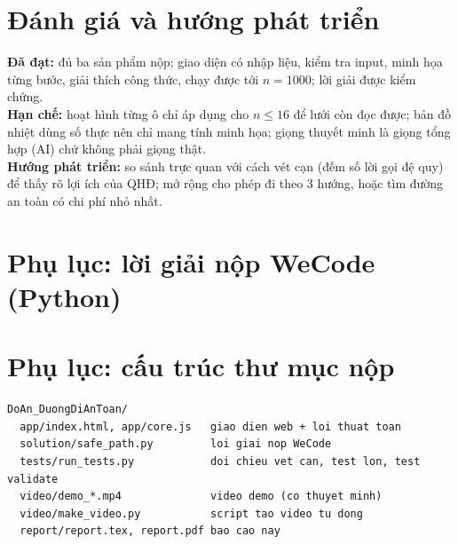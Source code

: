 \documentclass[12pt,a4paper]{article}
\begin{document}
\section{Đánh giá và hướng phát triển}
\textbf{Đã đạt:} đủ ba sản phẩm nộp; giao diện có nhập liệu, kiểm tra input, minh họa từng bước, giải thích công thức, chạy được tới $n=1000$; lời giải được kiểm chứng.\\
\textbf{Hạn chế:} hoạt hình từng ô chỉ áp dụng cho $n\le16$ để lưới còn đọc được; bản đồ nhiệt dùng số thực nên chỉ mang tính minh họa; giọng thuyết minh là giọng tổng hợp (AI) chứ không phải giọng thật.\\
\textbf{Hướng phát triển:} so sánh trực quan với cách vét cạn (đếm số lời gọi đệ quy) để thấy rõ lợi ích của QHĐ; mở rộng cho phép đi theo 3 hướng, hoặc tìm đường an toàn có chi phí nhỏ nhất.

\appendix
\section{Phụ lục: lời giải nộp WeCode (Python)}


\section{Phụ lục: cấu trúc thư mục nộp}
\begin{lstlisting}[numbers=none]
DoAn_DuongDiAnToan/
  app/index.html, app/core.js   giao dien web + loi thuat toan
  solution/safe_path.py         loi giai nop WeCode
  tests/run_tests.py            doi chieu vet can, test lon, test validate
  video/demo_*.mp4              video demo (co thuyet minh)
  video/make_video.py           script tao video tu dong
  report/report.tex, report.pdf bao cao nay
\end{lstlisting}
\end{document}
